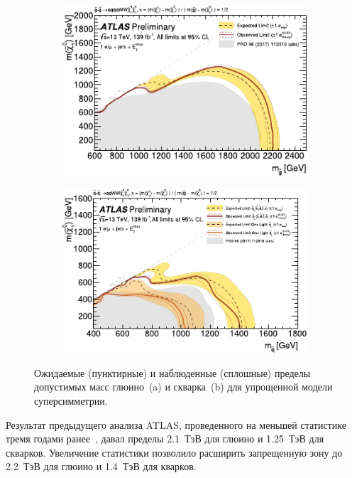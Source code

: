 \documentclass[a4paper, 10pt, twocolumn]{article}
\begin{document}
\begin{figure}[p]%
	\centering
	\begin{subfigure}{\linewidth}
		\includegraphics[width=\linewidth]{figures/gg-qq-limits-mg}
		\caption{}
		\label{fig:gmass-limit}
	\end{subfigure}
	\begin{subfigure}{\linewidth}
		\includegraphics[width=\linewidth]{figures/gg-qq-limits-mq}
		\caption{}
		\label{fig:qmass-limit}
	\end{subfigure}
	\caption{Ожидаемые (пунктирные) и наблюденные (сплошные) пределы 
	допустимых масс глюино~(a) и скварка~(b) для упрощенной модели 
	суперсимметрии.}
	\label{fig:gg-qq-limits}
\end{figure}%

Результат предыдущего анализа ATLAS, проведенного на меньшей статистике 
тремя годами ранее~\cite{gg-qq-earlyRun2}, давал пределы 2.1~ТэВ для 
глюино и 1.25~ТэВ для скварков. Увеличение статистики позволило 
расширить запрещенную зону до 2.2~ТэВ для глюино и 1.4~ТэВ для кварков.
\end{document}
